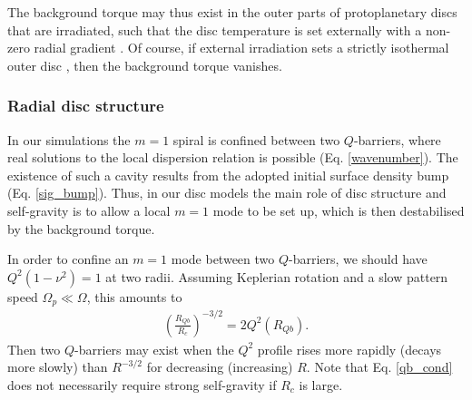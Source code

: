   The background torque may thus exist in the outer
  parts of protoplanetary discs that are irradiated, such
  that the disc temperature is set externally with a non-zero radial
  gradient \citep[e.g.][]{stamatellos08}. Of course, if external irradiation sets a strictly
  isothermal outer disc \citep[e.g.][]{boley09}, then the background
  torque vanishes.      


  
     
 
  \subsubsection{Radial disc structure}
  In our simulations the 
  $m=1$ spiral is confined between two $Q$-barriers, where real solutions to the local
  dispersion relation is possible (Eq. \ref{wavenumber}). The
  existence of such a cavity results from the adopted initial surface
  density bump (Eq. \ref{sig_bump}).  
  Thus, in our disc models the main role of disc structure 
  and self-gravity is to allow a local $m=1$ mode to be set up, which is then 
  destabilised by the background torque. 
  
  In order to confine an $m=1$ mode between two $Q$-barriers, we
  should have $Q^2(1-\nu^2)=1$ at two radii. Assuming 
  Keplerian rotation and a slow pattern speed $\Omega_p\ll\Omega$,
  this amounts to 
  \begin{align}\label{qb_cond}
    \left(\frac{R_{Qb}}{R_c}\right)^{-3/2} = 2Q^2(R_{Qb}). 
  \end{align}
  Then two $Q$-barriers may exist when the $Q^2$ profile
  rises more rapidly (decays more slowly) than $R^{-3/2}$
  for decreasing (increasing) $R$. Note that 
  Eq. \ref{qb_cond} does not necessarily require strong self-gravity
  if $R_c$ is large. 
  

